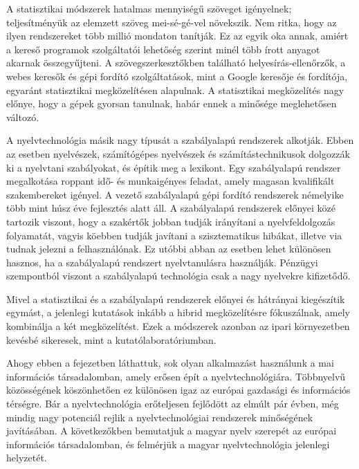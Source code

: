 \begin{multicols}{2}
  A statisztikai módszerek hatalmas mennyi\-sé\-gű szöveget igényelnek; teljesítményük az elemzett szöveg mei-sé-gé-vel növekszik. Nem ritka, hogy az ilyen rendszereket több millió mondaton tanítják. Ez az egyik oka annak, amiért a kereső programok szolgáltatói lehetőség szerint minél több írott anyagot akarnak össze\-gyűj\-te\-ni. A szövegszerkesztőkben található helyesírás-ellenőrzők, a webes keresők és gépi fordító szolgáltatások, mint a Google keresője és fordítója, egyaránt statisztikai megközelítésen alapulnak. A statisztikai megközelítés nagy előnye, hogy a gépek gyorsan tanulnak, habár ennek a minősége meglehetősen változó.

  A nyelvtechnológia másik nagy típusát a szabályalapú rendszerek alkotják. Ebben az esetben nyelvészek, számítógépes nyel\-vé\-szek és számítástechnikusok dolgozzák ki a nyelvtani szabályokat, és építik meg a lexikont. Egy szabályalapú rendszer megalkotása roppant idő- és munkaigényes feladat, amely magasan kvalifikált szak\-em\-be\-re\-ket igényel. A vezető szabályalapú gépi fordító rendszerek némelyike több mint húsz éve fejlesztés alatt áll. A szabályalapú rendszerek előnyei közé tartozik viszont, hogy a szakértők jobban tudják irányítani a nyelvfeldolgozás fo\-lya\-ma\-tát, va\-gyis köebben tudják javítani a szisztematikus hibákat, illetve via tudnak jelezni a felhasználónak. Ez utóbbi abban az esetben lehet különösen hasznos, ha a sza\-bály\-ala\-pú rendszert nyelvtanulásra használják. Pénzügyi szempontból viszont a sza\-bály\-ala\-pú technológia csak a nagy nyelvekre kifizetődő.

  Mivel a statisztikai és a szabályalapú rendszerek előnyei és hátrányai kiegészítik egymást, a jelenlegi kutatások inkább a hibrid megközelítésre fókuszálnak, amely kombinálja a két megközelítést. Ezek a módszerek azonban az ipari környezetben kevésbé sikeresek, mint a kutatólaboratóriumban. 

  Ahogy ebben a fejezetben láthattuk, sok olyan alkalmazást használunk a mai információs társadalomban, amely erősen épít a nyelvtechnológiára. Többnyelvű közösségének köszönhetően ez különösen igaz az európai gazdasági és információs térségre. Bár a nyelvtechnológia erőteljesen fejlődött az elmúlt pár évben, még mindig nagy potenciál rejlik a nyelvtechnológiai rendszerek minőségének ja\-ví\-tá\-sá\-ban. A következőkben bemutatjuk a magyar nyelv szerepét az európai információs társadalomban, és felmérjük a magyar nyelvtechnológia jelenlegi helyzetét.
  \end{multicols}


